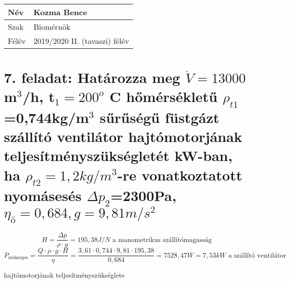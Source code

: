 \begin{tabular}{ | p{2cm} | p{14cm} | } 
	\hline
	Név & Kozma Bence \\ 
	\hline
	Szak & Biomérnök \\ 
	\hline
	Félév & 2019/2020 II. (tavaszi) félév \\ 
	\hline
\end{tabular}
\section*{7. feladat: Határozza meg $\dot{V}=13000$ m$^3$/h, t$_1=200^o$ C hőmérsékletű $\rho_{t1}$=0,744kg/m$^3$ sűrűségű füstgázt szállító ventilátor hajtómotorjának teljesítményszükségletét kW-ban, ha $\rho_{t2}=1,2kg/m^3$-re vonatkoztatott nyomásesés $\Delta p_{2}$=2300Pa, $\eta_{\text{ö}}=0,684, g=9,81m/s^2$}
$$
H=\frac{\Delta p}{\rho\cdot g}=195,38J/N\text{ a manometrikus szállítómagasság}
$$
$$
P_{\text{szükséges}}=\frac{Q\cdot\rho\cdot g\cdot H}{\eta}=\frac{3,61\cdot0,744\cdot 9,81\cdot 195,38}{0,684}=7528,47W=7,53kW\text{ a szállító ventilátor}
$$
\begin{center}
hajtómotorjának teljesítményszükséglete
\end{center}